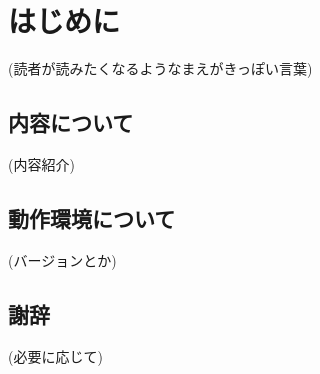 \chapter{はじめに}
\label{chap:preface}

(読者が読みたくなるようなまえがきっぽい言葉)

\section*{内容について}

(内容紹介)

\section*{動作環境について}

(バージョンとか)

\section*{謝辞}

(必要に応じて)
